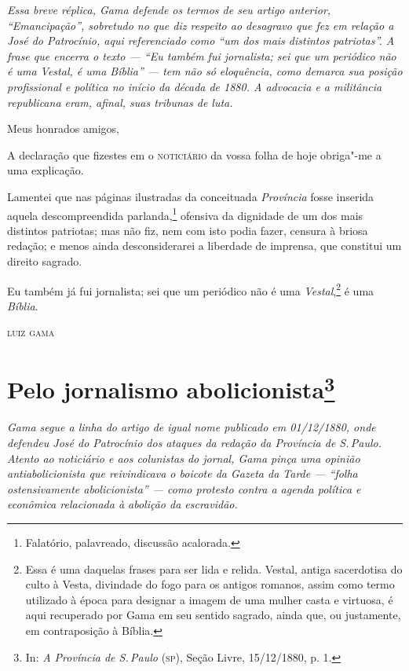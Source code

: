 \begin{flushleft}
{\footnotesize\itshape
Essa breve réplica, Gama defende os termos de seu artigo anterior,
``Emancipação'', sobretudo no que diz respeito ao desagravo que fez em
relação a José do Patrocínio, aqui referenciado como ``um dos mais
distintos patriotas''. A frase que encerra o texto --- ``Eu também fui
jornalista; sei que um periódico não é uma Vestal, é uma Bíblia'' --- tem
não só eloquência, como demarca sua posição profissional e política no
início da década de 1880. A advocacia e a militância republicana eram,
afinal, suas tribunas de luta.}
\end{flushleft}

\noindent{}Meus honrados amigos,

A declaração que fizestes em o \textsc{noticiário} da vossa folha de hoje
obriga"-me a uma explicação.

Lamentei que nas páginas ilustradas da conceituada \emph{Província}
fosse inserida aquela descompreendida parlanda,\footnote{Falatório,
  palavreado, discussão acalorada.} ofensiva da dignidade de um dos mais
distintos patriotas; mas não fiz, nem com isto podia fazer, censura à
briosa redação; e menos ainda desconsiderarei a liberdade de imprensa,
que constitui um direito sagrado.

Eu também já fui jornalista; sei que um periódico não é uma
\emph{Vestal},\footnote{Essa é uma daquelas frases para ser lida e relida.
  Vestal, antiga sacerdotisa do culto à Vesta, divindade do fogo para os
  antigos romanos, assim como termo utilizado à época para designar a
  imagem de uma mulher casta e virtuosa, é aqui recuperado por Gama em
  seu sentido sagrado, ainda que, ou justamente, em contraposição à
  Bíblia.} é uma \emph{Bíblia}.

\hfill\textsc{luiz gama}

\chapter{Pelo jornalismo abolicionista\footnote[*]{In: \emph{A Província de
  S.\,Paulo} (\textsc{sp}), Seção Livre, 15/12/1880, p. 1.}}

\begin{flushleft}
{\footnotesize\itshape
Gama segue a linha do artigo de igual nome publicado em
01/12/1880, onde defendeu José do Patrocínio dos ataques da redação da
\emph{Província de S.\,Paulo}. Atento ao noticiário e aos colunistas do jornal,
Gama pinça uma opinião antiabolicionista que reivindicava o boicote da
\emph{Gazeta da Tarde} --- ``folha ostensivamente abolicionista'' --- como protesto
contra a agenda política e econômica relacionada à abolição da
escravidão.}
\end{flushleft} 

